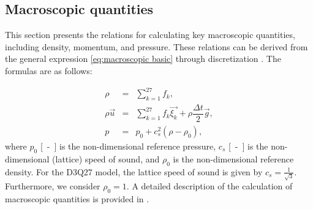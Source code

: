 \subsection{Macroscopic quantities}\label{macro}
This section presents the relations for calculating key macroscopic quantities, including density, momentum, and pressure. These relations can be derived from the general expression \eqref{eq:macroscopic basic} through discretization \cite{Kruger}. The formulas are as follows:

\begin{subequations}\label{macroeq}
	\begin{eqnarray}
		\label{rho}
		\rho &=& \sum_{k=1}^{27} f_{k},\\[3pt]
		\rho \vec{u} &=& \sum_{k=1}^{27} f_{k} \vec{\xi_{k}} + \rho \dfrac{\Delta t}{2} \vec{g},\\[3pt]
		p &=& p_0 + c_{s}^{2} (\rho - \rho_0),
	\end{eqnarray}
\end{subequations}
where $ p_0 $ \si{[-]} is the non-dimensional reference pressure, $ c_s $ \si{[-]} is the non-dimensional (lattice) speed of sound, and $ \rho_0 $ is the non-dimensional reference density. For the D3Q27 model, the lattice speed of sound is given by $ c_s = \frac{1}{\sqrt{3}} $. Furthermore, we consider $ \rho_0 = 1 $. A detailed description of the calculation of macroscopic quantities is provided in \cite{Kruger}.